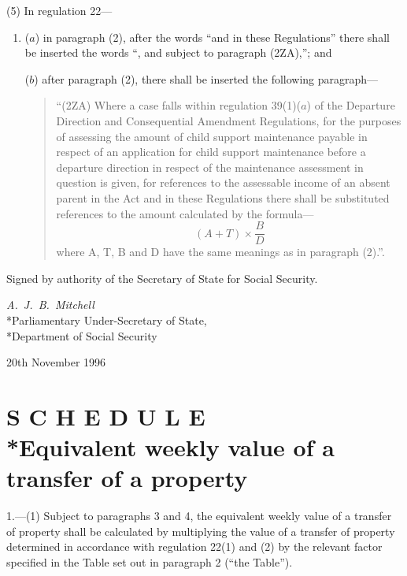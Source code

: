 \documentclass[12pt,a4paper]{article}
\begin{document}
(5) In regulation 22—
\begin{enumerate}\item[]
($a$) in paragraph (2), after the words “and in these Regulations” there shall be
inserted the words “, and subject to paragraph (2ZA),”; and

($b$) after paragraph (2), there shall be inserted the following paragraph—
\begin{quotation}
“(2ZA) Where a case falls within regulation 39(1)($a$) of the Departure Direction
and Consequential Amendment Regulations, for the purposes of assessing the
amount of child support maintenance payable in respect of an application for
child support maintenance before a departure direction in respect of the
maintenance assessment in question is given, for references to the assessable
income of an absent parent in the Act and in these Regulations there shall be
substituted references to the amount calculated by the formula—
\[(A + T) \times \frac{B}{D}\]
where A, T, B and D have the same meanings as in paragraph (2).”.
\end{quotation}
\end{enumerate}


\bigskip

Signed by authority of the Secretary of State for Social Security.

{\raggedleft
\emph{A.\ J.\ B.\ Mitchell}\\*Parliamentary Under-Secretary of
State,\\*Department of Social Security

}

20th November 1996

\small

\part[Schedule --- Equivalent weekly value of a transfer of a property]{S C H E D U L E\\*Equivalent weekly value of a transfer of a property}

\renewcommand\parthead{--- Schedule}

1.—(1) Subject to
paragraphs 3 and 4, the equivalent weekly value of a transfer of property shall
be calculated by multiplying the value of a transfer of property determined in
accordance with regulation 22(1) and (2) by the relevant factor specified in the
Table set out in paragraph 2 (“the Table”).
\end{document}
